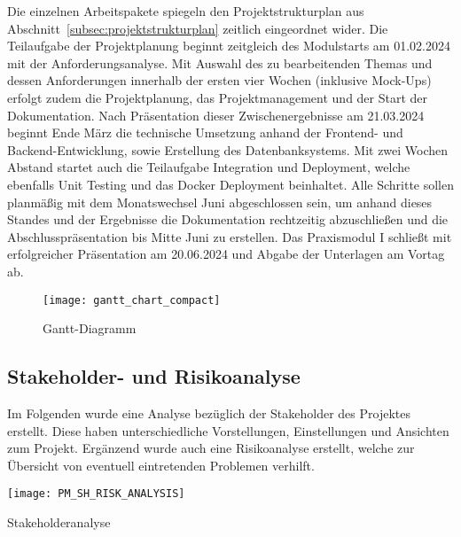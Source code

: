 Die einzelnen Arbeitspakete spiegeln den Projektstrukturplan aus Abschnitt~\ref{subsec:projektstrukturplan} zeitlich eingeordnet wider.
Die Teilaufgabe der Projektplanung beginnt zeitgleich des Modulstarts am 01.02.2024 mit der Anforderungsanalyse.
Mit Auswahl des zu bearbeitenden Themas und dessen Anforderungen innerhalb der ersten vier Wochen (inklusive Mock-Ups) erfolgt zudem die Projektplanung, das Projektmanagement und der Start der Dokumentation.
Nach Präsentation dieser Zwischenergebnisse am 21.03.2024 beginnt Ende März die technische Umsetzung anhand der Frontend- und Backend-Entwicklung, sowie Erstellung des Datenbanksystems.
Mit zwei Wochen Abstand startet auch die Teilaufgabe Integration und Deployment, welche ebenfalls Unit Testing und das Docker Deployment beinhaltet.
Alle Schritte sollen planmäßig mit dem Monatswechsel Juni abgeschlossen sein, um anhand dieses Standes und der Ergebnisse die Dokumentation rechtzeitig abzuschließen und die Abschlusspräsentation bis Mitte Juni zu erstellen.
Das Praxismodul I schließt mit erfolgreicher Präsentation am 20.06.2024 und Abgabe der Unterlagen am Vortag ab.

\begin{figure}[H]
    \centering
    \texttt{[image: gantt\_chart\_compact]}
    \caption{Gantt-Diagramm}\label{fig:gantt-diagramm}
\end{figure}

\newpage

\subsection{Stakeholder- und Risikoanalyse}\label{subsec:Stakeholder-Risikoanalyse}
Im Folgenden wurde eine Analyse bezüglich der Stakeholder des Projektes erstellt.
Diese haben unterschiedliche Vorstellungen, Einstellungen und Ansichten zum Projekt.
Ergänzend wurde auch eine Risikoanalyse erstellt, welche zur Übersicht von eventuell eintretenden Problemen verhilft. \par

\begin{table}[h!]
    \centering
    \texttt{[image: PM\_SH\_RISK\_ANALYSIS]}
    \caption{Stakeholderanalyse}\label{tab:stakeholderanalyse}
\end{table}


